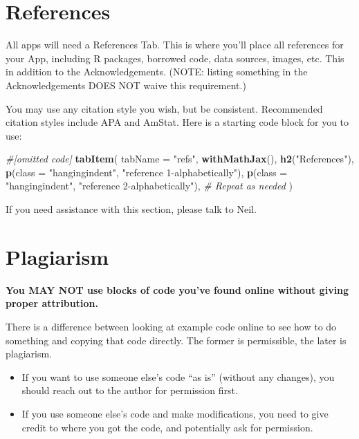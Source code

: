 \documentclass[]{book}
\newenvironment{Shaded}{\begin{snugshade}}{\end{snugshade}}
\newcommand{\CommentTok}[1]{\textcolor[rgb]{0.56,0.35,0.01}{\textit{#1}}}
\newcommand{\DataTypeTok}[1]{\textcolor[rgb]{0.13,0.29,0.53}{#1}}
\newcommand{\KeywordTok}[1]{\textcolor[rgb]{0.13,0.29,0.53}{\textbf{#1}}}
\newcommand{\NormalTok}[1]{#1}
\newcommand{\StringTok}[1]{\textcolor[rgb]{0.31,0.60,0.02}{#1}}
\providecommand{\tightlist}{%
  \setlength{\itemsep}{0pt}\setlength{\parskip}{0pt}}
\begin{document}
\hypertarget{references-1}{%
\section{References}\label{references-1}}

All apps will need a References Tab. This is where you'll place all references for your App, including R packages, borrowed code, data sources, images, etc. This in addition to the Acknowledgements. (NOTE: listing something in the Acknowledgements DOES NOT waive this requirement.)

You may use any citation style you wish, but be consistent. Recommended citation styles include APA and AmStat. Here is a starting code block for you to use:

\begin{Shaded}
\begin{Highlighting}[]
\CommentTok{#[omitted code]}
\KeywordTok{tabItem}\NormalTok{(}
  \DataTypeTok{tabName =} \StringTok{"refs"}\NormalTok{,}
  \KeywordTok{withMathJax}\NormalTok{(),}
  \KeywordTok{h2}\NormalTok{(}\StringTok{"References"}\NormalTok{),}
  \KeywordTok{p}\NormalTok{(}\DataTypeTok{class =} \StringTok{"hangingindent"}\NormalTok{,}
    \StringTok{"reference 1-alphabetically"}\NormalTok{),}
  \KeywordTok{p}\NormalTok{(}\DataTypeTok{class =} \StringTok{"hangingindent"}\NormalTok{,}
    \StringTok{"reference 2-alphabetically"}\NormalTok{),}
  \CommentTok{# Repeat as needed}
\NormalTok{)}
\end{Highlighting}
\end{Shaded}

If you need assistance with this section, please talk to Neil.

\hypertarget{plagiarism}{%
\section{Plagiarism}\label{plagiarism}}

\textbf{You MAY NOT use blocks of code you've found online without giving proper attribution.}

There is a difference between looking at example code online to see how to do something and copying that code directly. The former is permissible, the later is plagiarism.

\begin{itemize}
\tightlist
\item
  If you want to use someone else's code ``as is'' (without any changes), you should reach out to the author for permission first.
\item
  If you use someone else's code and make modifications, you need to give credit to where you got the code, and potentially ask for permission.
\end{itemize}
\end{document}
